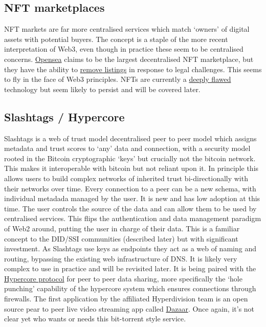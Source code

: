 \subsection{NFT marketplaces}
NFT markets are far more centralised services which match `owners' of digital assets with potential buyers. The concept is a staple of the more recent interpretation of Web3, even though in practice these seem to be centralised concerns. \href{https://opensea.io/}{Opensea} claims to be the largest decentralised NFT marketplace, but they have the ability to \href{https://thedefiant.io/sad-frogs-delisted-opensea/}{remove listings} in response to legal challenges. This seems to fly in the face of Web3 principles. NFTs are currently a \href{https://tante.cc/2021/12/17/the-third-web/}{deeply flawed} technology but seem likely to persist and will be covered later.
\subsection{Slashtags / Hypercore}
Slashtags is a web of trust model decentralised peer to peer model which assigns metadata and trust scores to `any' data and connection, with a security model rooted in the Bitcoin cryptographic `keys' but crucially not the bitcoin network. This makes it interoperable with bitcoin but not reliant upon it. In principle this allows users to build complex networks of inherited trust bi-directionally with their networks over time. Every connection to a peer can be a new schema, with individual metadada managed by the user. It is new and has low adoption at this time. The user controls the source of the data and can allow them to be used by centralised services. This flips the authentication and data management paradigm of Web2 around, putting the user in charge of their data. This is a familiar concept to the DID/SSI communities (described later) but with significant investment. As Slashtags use keys as endpoints they act as a web of naming and routing, bypassing the existing web infrastructure of DNS. It is likely very complex to use in practice and will be revisited later. It is being paired with the \href{https://hypercore-protocol.org/}{Hypercore protocol} for peer to peer data sharing, more specifically the `hole punching' capability of the hypercore system which ensures connections through firewalls\cite{ford2005peer}. The first application by the affiliated Hyperdivision team is an open source pear to peer live video streaming app called \href{https://dazaar.com/}{Dazaar}. Once again, it's not clear yet who wants or needs this bit-torrent style service. 
